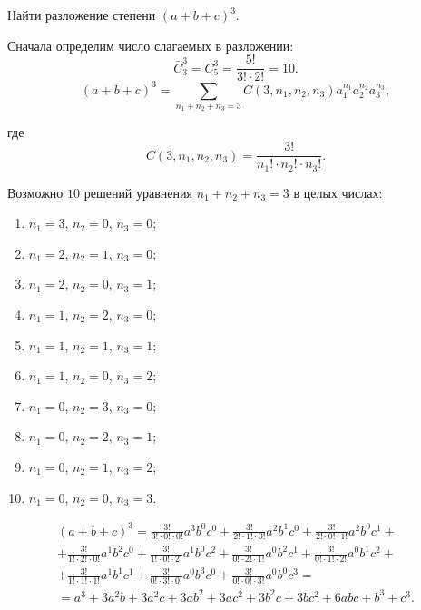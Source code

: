 \begin{example}
    Найти разложение степени \((a + b + c)^3\).

    Сначала определим число слагаемых в разложении:
    \[
        \bar{C}_3^3 = C_5^3 = \frac{5!}{3! \cdot 2!} = 10.
    \]
    \[
        (a + b + c)^3 = \sum_{n_1 + n_2 + n_3 = 3} C(3, n_1, n_2, n_3) a_1^{n_1} a_2^{n_2} a_3^{n_3},
    \]

    где
    \[
        C(3, n_1, n_2, n_3) = \frac{3!}{n_1! \cdot n_2! \cdot n_3!}.
    \]

    Возможно \(10\) решений уравнения \(n_1 + n_2 + n_3 = 3\) в целых числах:
    \begin{multicols}{2}
        \begin{enumerate}
            \item \(n_1 = 3\), \(n_2 = 0\), \(n_3 = 0\);
            \item \(n_1 = 2\), \(n_2 = 1\), \(n_3 = 0\);
            \item \(n_1 = 2\), \(n_2 = 0\), \(n_3 = 1\);
            \item \(n_1 = 1\), \(n_2 = 2\), \(n_3 = 0\);
            \item \(n_1 = 1\), \(n_2 = 1\), \(n_3 = 1\);
        \end{enumerate}
        \begin{enumerate}
            \setcounter{enumi}{5}
            \item \(n_1 = 1\), \(n_2 = 0\), \(n_3 = 2\);
            \item \(n_1 = 0\), \(n_2 = 3\), \(n_3 = 0\);
            \item \(n_1 = 0\), \(n_2 = 2\), \(n_3 = 1\);
            \item \(n_1 = 0\), \(n_2 = 1\), \(n_3 = 2\);
            \item \(n_1 = 0\), \(n_2 = 0\), \(n_3 = 3\).
        \end{enumerate}
    \end{multicols}

    \begin{gather*}
        (a + b + c)^3 =
        \frac{3!}{3! \cdot 0! \cdot 0!} a^3 b^0 c^0 + \frac{3!}{2! \cdot 1! \cdot 0!} a^2 b^1 c^0 + \frac{3!}{2! \cdot 0! \cdot 1!} a^2 b^0 c^1 + \\ + \frac{3!}{1! \cdot 2! \cdot 0!} a^1 b^2 c^0 + \frac{3!}{1! \cdot 0! \cdot 2!} a^1 b^0 c^2 + \frac{3!}{0! \cdot 2! \cdot 1!} a^0 b^2 c^1 + \frac{3!}{0! \cdot 1! \cdot 2!} a^0 b^1 c^2 + \\ + \frac{3!}{1! \cdot 1! \cdot 1!} a^1 b^1 c^1 + \frac{3!}{0! \cdot 3! \cdot 0!} a^0 b^3 c^0 + \frac{3!}{0! \cdot 0! \cdot 3!} a^0 b^0 c^3 = \\ =
        a^3 + 3 a^2 b + 3 a^2 c + 3 a b^2 + 3 a c^2 + 3 b^2 c + 3 b c^2 + 6 a b c + b^3 + c^3.
    \end{gather*}
\end{example}

